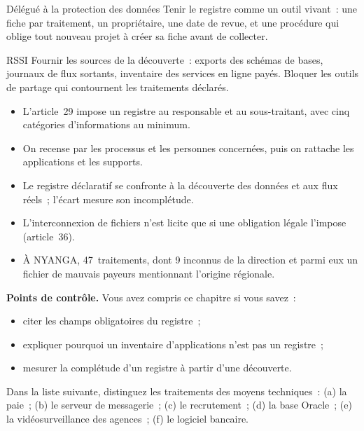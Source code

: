 \begin{boxmetier}{Délégué à la protection des données}
Tenir le registre comme un outil vivant~: une fiche par traitement, un
propriétaire, une date de revue, et une procédure qui oblige tout nouveau
projet à créer sa fiche avant de collecter.
\end{boxmetier}

\begin{boxmetier}{RSSI}
Fournir les sources de la découverte~: exports des schémas de bases,
journaux de flux sortants, inventaire des services en ligne payés. Bloquer
les outils de partage qui contournent les traitements déclarés.
\end{boxmetier}

\begin{boxresume}
\begin{itemize}
    \item L'article~29 impose un registre au responsable et au
          sous-traitant, avec cinq catégories d'informations au minimum.
    \item On recense par les processus et les personnes concernées, puis on
          rattache les applications et les supports.
    \item Le registre déclaratif se confronte à la découverte des données et
          aux flux réels~; l'écart mesure son incomplétude.
    \item L'interconnexion de fichiers n'est licite que si une obligation
          légale l'impose (article~36).
    \item À NYANGA, 47~traitements, dont 9 inconnus de la direction et parmi
          eux un fichier de mauvais payeurs mentionnant l'origine régionale.
\end{itemize}
\end{boxresume}

\begin{boxinfo}
\textbf{Points de contrôle.} Vous avez compris ce chapitre si vous savez~:
\begin{itemize}
    \item citer les champs obligatoires du registre~;
    \item expliquer pourquoi un inventaire d'applications n'est pas un
          registre~;
    \item mesurer la complétude d'un registre à partir d'une découverte.
\end{itemize}
\end{boxinfo}

\begin{boxexo}[title={\ding{45}\quad Exercice~4.1. Traitement ou application \niveaubase}]
Dans la liste suivante, distinguez les traitements des moyens
techniques~: (a) la paie~; (b) le serveur de messagerie~; (c) le
recrutement~; (d) la base Oracle~; (e) la vidéosurveillance des agences~;
(f) le logiciel bancaire.
\end{boxexo}

